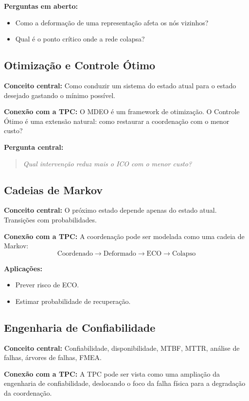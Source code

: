 \documentclass[12pt,a4paper]{article}
\begin{document}
\textbf{Perguntas em aberto:}
\begin{itemize}
    \item Como a deformação de uma representação afeta os nós vizinhos?
    \item Qual é o ponto crítico onde a rede colapsa?
\end{itemize}

\subsection{Otimização e Controle Ótimo}

\textbf{Conceito central:} Como conduzir um sistema do estado atual para o estado desejado gastando o mínimo possível.

\textbf{Conexão com a TPC:}
O MDEO é um framework de otimização. O Controle Ótimo é uma extensão natural: como restaurar a coordenação com o menor custo?

\textbf{Pergunta central:}
\begin{quote}
\textit{Qual intervenção reduz mais o ICO com o menor custo?}
\end{quote}

\subsection{Cadeias de Markov}

\textbf{Conceito central:} O próximo estado depende apenas do estado atual. Transições com probabilidades.

\textbf{Conexão com a TPC:}
A coordenação pode ser modelada como uma cadeia de Markov:
\[
\text{Coordenado} \to \text{Deformado} \to \text{ECO} \to \text{Colapso}
\]

\textbf{Aplicações:}
\begin{itemize}
    \item Prever risco de ECO.
    \item Estimar probabilidade de recuperação.
\end{itemize}

\subsection{Engenharia de Confiabilidade}

\textbf{Conceito central:} Confiabilidade, disponibilidade, MTBF, MTTR, análise de falhas, árvores de falhas, FMEA.

\textbf{Conexão com a TPC:}
A TPC pode ser vista como uma ampliação da engenharia de confiabilidade, deslocando o foco da falha física para a degradação da coordenação.
\end{document}
